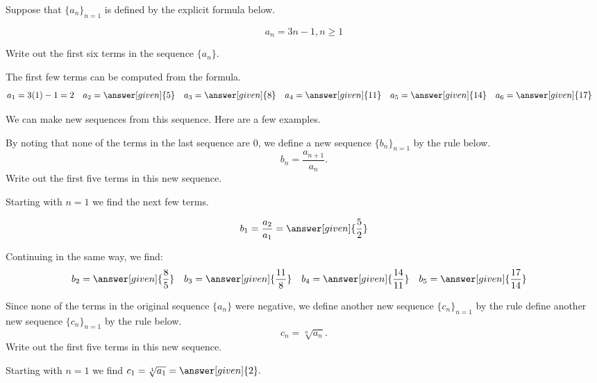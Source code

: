 \documentclass{ximera}
\begin{document}
\begin{example}
Suppose that $\{a_n\}_{n=1}$ is defined by the explicit formula below.

\[
a_n = 3n-1, n \geq 1
\]

Write out the first six terms in the sequence $\{a_n\}$.
\begin{explanation}
  The first few terms can be computed from the formula.
    \begin{align*}
      a_1 &= 3(1)-1=2 & 
      a_2 &= \answer[given]{5} & 
      a_3 &= \answer[given]{8} & 
      a_4 &= \answer[given]{11} & 
      a_5 &= \answer[given]{14}  & 
      a_6 &= \answer[given]{17} 
    \end{align*}
\end{explanation}


We can make new sequences from this sequence.  Here are a few examples.

\begin{question}
By noting that none of the terms in the last sequence are $0$, we
define a new sequence $\{b_n\}_{n=1}$ by the rule below.
\[
b_n = \frac{a_{n+1}}{a_n}. 
\]
Write out the first five terms in this new sequence.

\begin{explanation}
Starting with $n=1$ we find the next few terms.

\[      b_1 = \frac{a_2}{a_1} = \answer[given]{\frac{5}{2}}       \]
      
Continuing in the same way, we find:     
     \begin{align*}
      	b_2 &=  \answer[given]{\frac{8}{5}}  & 
	b_3 &= \answer[given]{\frac{11}{8}}  & 
	b_4 &= \answer[given]{\frac{14}{11}}  & 
	b_5 &=  \answer[given]{\frac{17}{14}}  & 
    \end{align*}
    
\end{explanation}
    
\end{question}

\begin{question}

Since none of the terms in the original sequence $\{a_n\}$ were
negative, we define another new sequence $\{c_n\}_{n=1}$ by the rule
define another new sequence $\{c_n\}_{n=1}$ by the rule below.
\[
c_n = \sqrt[n]{a_n} .
\]
Write out the first five terms in this new sequence.

\begin{explanation}
Starting with $n=1$ we find  $c_1 = \sqrt[1]{a_1} = \answer[given]{2}.$
      

\end{explanation}
\end{question}
\end{example}
\end{document}
